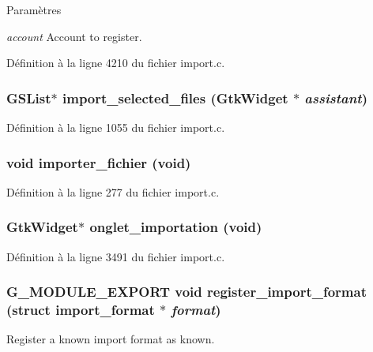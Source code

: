 \begin{DoxyParams}{Paramètres}
\item[{\em account}]Account to register. \end{DoxyParams}


Définition à la ligne 4210 du fichier import.c.

\subsubsection[{import\_\-selected\_\-files}]{\setlength{\rightskip}{0pt plus 5cm}GSList$\ast$ import\_\-selected\_\-files (GtkWidget $\ast$ {\em assistant})}\label{import_8h_af47b0c4c36291dc40375ad1d3b402880}


Définition à la ligne 1055 du fichier import.c.

\subsubsection[{importer\_\-fichier}]{\setlength{\rightskip}{0pt plus 5cm}void importer\_\-fichier (void)}\label{import_8h_a109c976310f1373efb8fdb52b3ee4263}


Définition à la ligne 277 du fichier import.c.

\subsubsection[{onglet\_\-importation}]{\setlength{\rightskip}{0pt plus 5cm}GtkWidget$\ast$ onglet\_\-importation (void)}\label{import_8h_a248bf76497a7936687f79e28da9ff0e8}


Définition à la ligne 3491 du fichier import.c.

\subsubsection[{register\_\-import\_\-format}]{\setlength{\rightskip}{0pt plus 5cm}G\_\-MODULE\_\-EXPORT void register\_\-import\_\-format (struct {\bf import\_\-format} $\ast$ {\em format})}\label{import_8h_a363697c684d8b70752d14c4a6eef0f73}
Register a known import format as known.


